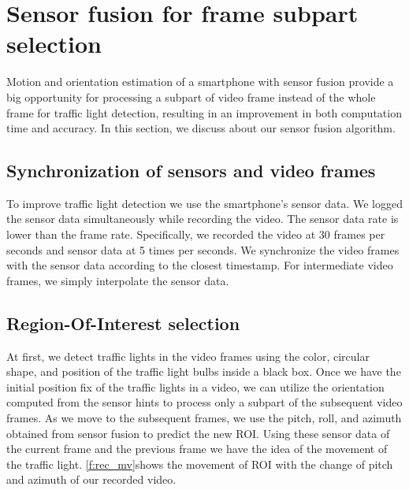 \section{Sensor fusion for frame subpart selection}
Motion and orientation estimation of a smartphone with sensor fusion provide a big opportunity for processing a subpart of video frame instead of the whole frame for traffic light detection, resulting in an improvement in both computation time and accuracy.
In this section, we discuss about our sensor fusion algorithm. 

\subsection{Synchronization of sensors and video frames}
To improve traffic light detection we use the smartphone's sensor data.
We logged the sensor data simultaneously while recording the video.
The sensor data rate is lower than the frame rate. 
Specifically, we recorded the video at 30 frames per seconds and sensor data at 5 times per seconds. 
We synchronize the video frames with the sensor data according to the closest timestamp.
For intermediate video frames, we simply interpolate the sensor data.



\subsection{Region-Of-Interest selection}
\label{s:roi}
At first, we detect traffic lights in the video frames using the color, circular shape, and position of the traffic light bulbs inside a black box.
Once we have the initial position fix of the traffic lights in a video, we can utilize the orientation computed from the sensor hints to process only a subpart of the subsequent video frames. 
As we move to the subsequent frames, we use the pitch, roll, and azimuth obtained from sensor fusion to predict the new ROI.
Using these sensor data of the current frame and the previous frame we have the idea of the movement of the traffic light.
\ref{f:rec_mv}shows the movement of ROI with the change of pitch and azimuth of our recorded video.

